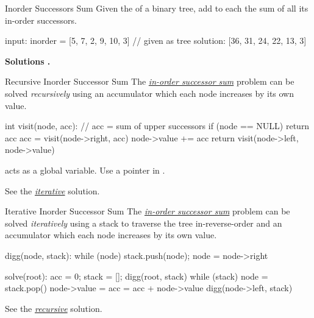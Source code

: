 \documentclass{cognito}
\begin{document}
\begin{note}{Inorder Successors Sum}
	Given the  of a binary tree, add to each  the sum of all its in-order successors.
	\begin{largecode}
 input: inorder = [5, 7, 2, 9, 10, 3]  // given as tree
 solution: [36, 31, 24, 22, 13, 3]
	\end{largecode}
	\bf Solutions \hyperref[note:Recursive Inorder Successor Sum]{\solutionref} \hyperref[note:Iterative Inorder Successor Sum]{\solutionref}.
\end{note}

\begin{note}{Recursive Inorder Successor Sum}
	The \hyperref[note:Inorder Successors Sum]{\it in-order successor sum} problem can be solved \emph{recursively}
	using an accumulator which each node increases by its own value.
	\begin{largecode}
 int visit(node, acc):  // acc = sum of upper successors
 	if (node == NULL) return acc
	acc = visit(node->right, acc)
	node->value += acc
	return visit(node->left, node->value)
	\end{largecode}
	\begin{remark}  acts as a global variable. Use a pointer in .\end{remark}
	\begin{remark} See the \hyperref[note:Iterative Inorder Successor Sum]{\it iterative} solution.\end{remark}\vspace{-5pt}
\end{note}

\begin{note}{Iterative Inorder Successor Sum}
	The \hyperref[note:Inorder Successors Sum]{\it in-order successor sum} problem can be solved \emph{iteratively}
	using a stack to traverse the tree in-reverse-order and an accumulator which each node increases by its own value.
	\begin{largecode}
 digg(node, stack):
 	while (node) {stack.push(node); node = node->right}

 solve(root):
 	acc = 0; stack = []; digg(root, stack)
	while (stack)
		node = stack.pop()
		node->value = acc = acc + node->value
		digg(node->left, stack)
	\end{largecode}
	\begin{remark} See the \hyperref[note:Recursive Inorder Successor Sum]{\it recursive} solution.\end{remark}\vspace{-5pt}
\end{note}
\end{document}
